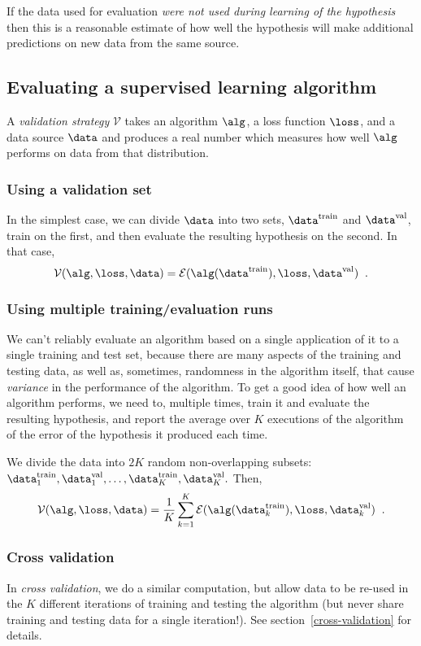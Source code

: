   If the data used for evaluation {\em were not used during learning
    of the hypothesis} then this is a reasonable estimate of how well
  the hypothesis will make additional predictions on new data from the
  same source.

  \subsection{Evaluating a supervised learning algorithm}

A {\em validation strategy} $\mathcal{V}$ takes an algorithm
$\alg$, a loss function $\loss$, and a data source
$\data$ and produces a real number which measures how well $\alg$
performs on data from that distribution.

\subsubsection{Using a validation set}
In the simplest case, we can divide $\data$ into two sets, 
$\data^\text{train}$ and $\data^\text{val}$, train on the first, and
then evaluate the resulting hypothesis on the second.  In that case, 
\[\mathcal{V}(\alg, \loss, \data) =
\mathcal{E}(\alg(\data^\text{train}),
\loss, \data^\text{val})\;\;.\]

\subsubsection{Using multiple training/evaluation runs}
We can't reliably evaluate an algorithm based on a single application of it to
a single training and test set, because there are many aspects of the
training and testing data, as well as, sometimes, randomness in
the algorithm itself, that cause {\em variance} in the performance of
the algorithm.  To get a good idea of how well an algorithm
performs, we need to, multiple times, train it and evaluate the
resulting hypothesis, and report the average over
$K$ executions of the algorithm of the error of the
hypothesis it produced each time.

We divide the data into $2K$ random non-overlapping subsets:
$\data_1^\text{train}, \data_1^\text{val}, \ldots,
\data_K^\text{train}, \data_K^\text{val}.$    Then,
\[\mathcal{V}(\alg, \loss, \data) =
\frac{1}{K}\sum_{k=1}^K \mathcal{E}(\alg(\data_k^\text{train}),
\loss, \data_k^\text{val})\;\;.\]

\subsubsection{Cross validation}
In {\em cross validation}, we do a similar computation, but allow data
to be re-used in the $K$ different iterations of training and testing
the algorithm (but never share training and testing data for a single
iteration!).  See section~\ref{cross-validation} for details.

